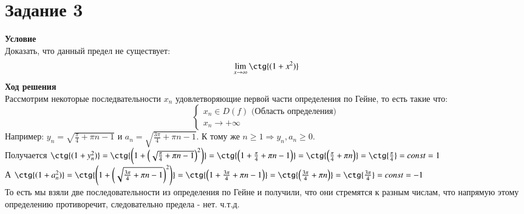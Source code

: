 \newpage
\section{Задание 3} 
{\bf\large Условие} \\
Доказать, что данный предел не существует:
\[
    \lim_{x\rightarrow\infty}{\ctg{(1+x^2)}}
\]
{\bf\large Ход решения} \\
Рассмотрим некоторые последвательности $x_n$ удовлетворяющие первой части определения по Гейне, то есть такие что:
\begin{equation*}
    \begin{cases}
        x_n \in D(f) \text{ (Область определения)} \\
        x_n \rightarrow +\infty
    \end{cases}
\end{equation*}
Например: $y_n = \sqrt{\frac{\pi}{4}+\pi n -1}$ и $a_n = \sqrt{\frac{3\pi}{4}+\pi n -1}$. К тому же $n\geq1\Rightarrow y_n,a_n\geq 0$. \\
Получается $\ctg{(1+y_n^2)}= \ctg{\left(1+\left(\sqrt{\frac{\pi}{4}+\pi n -1}\right)^2\right)}=\ctg{\left(1+\frac{\pi}{4}+\pi n -1\right)}=\ctg{\left(\frac{\pi}{4}+\pi n\right)}=\ctg{\frac{\pi}{4}}=const=1$\\
А $\ctg{(1+a_n^2)} = \ctg{\left(1+\left(\sqrt{\frac{3\pi}{4}+\pi n -1}\right)^2\right)}=\ctg{\left(1+\frac{3\pi}{4}+\pi n -1\right)}=\ctg{\left(\frac{3\pi}{4}+\pi n\right)}=\ctg{\frac{3\pi}{4}}=const=-1$\\
То есть мы взяли две последовательности из определения по Гейне и получили, что они стремятся к разным числам, что напрямую этому определению противоречит, следовательно предела - нет. ч.т.д. 